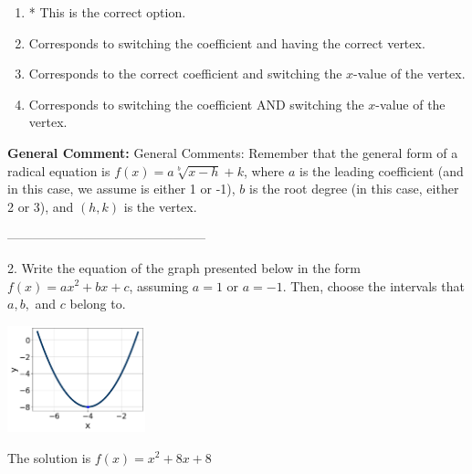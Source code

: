 \documentclass{extbook}[14pt]
\begin{document}
\begin{enumerate}[label=\Alph*.] 
\item * This is the correct option.  
\item Corresponds to switching the coefficient and having the correct vertex.  
\item Corresponds to the correct coefficient and switching the $x$-value of the vertex.  
\item Corresponds to switching the coefficient AND switching the $x$-value of the vertex.  
\end{enumerate} 
 
\textbf{General Comment:} General Comments: Remember that the general form of a radical equation is $ f(x) = a \sqrt[b]{x - h} + k $, where $a$ is the leading coefficient (and in this case, we assume is either 1 or -1), $b$ is the root degree (in this case, either 2 or 3), and $(h, k)$ is the vertex. 

-----------------------------------------------

2. Write the equation of the graph presented below in the form $f(x)=ax^2+bx+c$, assuming  $a=1$ or $a=-1$. Then, choose the intervals that $a, b,$ and $c$ belong to.
\begin{center} \includegraphics[width=0.3\textwidth]{../Figures/quadraticGraphToEquationA.png} \end{center} 

The solution is $ f(x) = x^{2} +8 x + 8 $ 
\end{document}
